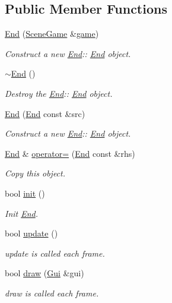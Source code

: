 \subsection*{Public Member Functions}
\begin{DoxyCompactItemize}
\item 
\hyperlink{class_end_a47e2de547a735828a077df495d74a80e}{End} (\hyperlink{class_scene_game}{Scene\+Game} \&\hyperlink{class_a_entity_aa2c05db944a8b7487eb8470dd20211ab}{game})
\begin{DoxyCompactList}\small\item\em Construct a new \hyperlink{class_end}{End}\+:\+: \hyperlink{class_end}{End} object. \end{DoxyCompactList}\item 
\mbox{\label{class_end_aa3481cbe712c9cdef228786ffa7f0aad}} 
\hyperlink{class_end_aa3481cbe712c9cdef228786ffa7f0aad}{$\sim$\+End} ()
\begin{DoxyCompactList}\small\item\em Destroy the \hyperlink{class_end}{End}\+:\+: \hyperlink{class_end}{End} object. \end{DoxyCompactList}\item 
\hyperlink{class_end_a630d7450a9969487d91aae9b3d35c6d8}{End} (\hyperlink{class_end}{End} const \&src)
\begin{DoxyCompactList}\small\item\em Construct a new \hyperlink{class_end}{End}\+:\+: \hyperlink{class_end}{End} object. \end{DoxyCompactList}\item 
\hyperlink{class_end}{End} \& \hyperlink{class_end_a52c805a4ff7a6477b25bb270effd0638}{operator=} (\hyperlink{class_end}{End} const \&rhs)
\begin{DoxyCompactList}\small\item\em Copy this object. \end{DoxyCompactList}\item 
bool \hyperlink{class_end_a1c57c2279d61916ea97aed566e8b3663}{init} ()
\begin{DoxyCompactList}\small\item\em Init \hyperlink{class_end}{End}. \end{DoxyCompactList}\item 
bool \hyperlink{class_end_a7154532cce1c86f4f5bfa98eb0c25574}{update} ()
\begin{DoxyCompactList}\small\item\em update is called each frame. \end{DoxyCompactList}\item 
bool \hyperlink{class_end_aad5c7ef71927eddfd634e0a0879cb99a}{draw} (\hyperlink{class_gui}{Gui} \&gui)
\begin{DoxyCompactList}\small\item\em draw is called each frame. \end{DoxyCompactList}\end{DoxyCompactItemize}
